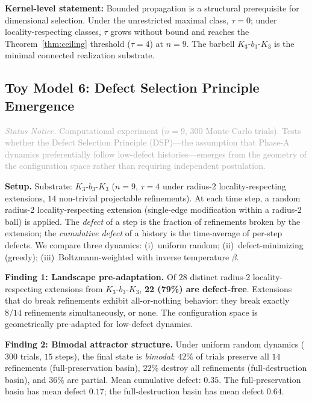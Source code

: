 \documentclass[11pt,a4paper]{article}
\theoremstyle{definition}
\theoremstyle{remark}
\newcommand{\statusnotice}[1]{%
  \medskip\noindent\textcolor{darkgray}{\textit{Status Notice.} #1}\medskip
}
\begin{document}
\textbf{Kernel-level statement:} Bounded propagation is a structural prerequisite for dimensional selection. Under the unrestricted maximal class, $\tau = 0$; under locality-respecting classes, $\tau$ grows without bound and reaches the Theorem~\ref{thm:ceiling} threshold ($\tau = 4$) at $n = 9$. The barbell $K_3\text{-}b_3\text{-}K_3$ is the minimal connected realization substrate.


\subsection{Toy Model 6: Defect Selection Principle Emergence}\label{app:toymodel6}

\statusnotice{Computational experiment ($n = 9$, $300$ Monte Carlo trials). Tests whether the Defect Selection Principle (DSP)---the assumption that Phase-A dynamics preferentially follow low-defect histories---emerges from the geometry of the configuration space rather than requiring independent postulation.}

\textbf{Setup.} Substrate: $K_3\text{-}b_3\text{-}K_3$ ($n = 9$, $\tau = 4$ under radius-2 locality-respecting extensions, $14$ non-trivial projectable refinements). At each time step, a random radius-2 locality-respecting extension (single-edge modification within a radius-2 ball) is applied. The \emph{defect} of a step is the fraction of refinements broken by the extension; the \emph{cumulative defect} of a history is the time-average of per-step defects. We compare three dynamics: (i)~uniform random; (ii)~defect-minimizing (greedy); (iii)~Boltzmann-weighted with inverse temperature $\beta$.

\textbf{Finding 1: Landscape pre-adaptation.} Of $28$ distinct radius-2 locality-respecting extensions from $K_3\text{-}b_3\text{-}K_3$, \textbf{22 (79\%) are defect-free}. Extensions that do break refinements exhibit all-or-nothing behavior: they break exactly $8/14$ refinements simultaneously, or none. The configuration space is geometrically pre-adapted for low-defect dynamics.

\textbf{Finding 2: Bimodal attractor structure.} Under uniform random dynamics ($300$ trials, $15$ steps), the final state is \emph{bimodal}: $42\%$ of trials preserve all $14$ refinements (full-preservation basin), $22\%$ destroy all refinements (full-destruction basin), and $36\%$ are partial. Mean cumulative defect: $0.35$. The full-preservation basin has mean defect $0.17$; the full-destruction basin has mean defect $0.64$.
\end{document}
